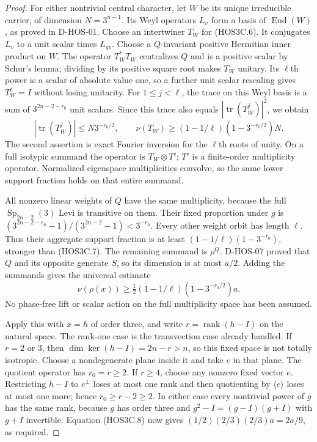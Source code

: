 \begin{proof}
For either nontrivial central character, let $W$ be its unique
irreducible carrier, of dimension $N=3^{n-1}$. Its Weyl operators
$L_v$ form a basis of $\operatorname{End}(W)$, as proved in D-HOS-01.
Choose an intertwiner $T_W$ for (HOS3C.6). It conjugates $L_v$ to
a unit scalar times $L_{gv}$. Choose a $Q$-invariant positive
Hermitian inner product on $W$. The operator $T_W^*T_W$ centralizes
$Q$ and is a positive scalar by Schur's lemma; dividing by its
positive square root makes $T_W$ unitary. Its $\ell$th power is
a scalar of absolute value one, so a further unit scalar rescaling
gives $T_W^\ell=I$ without losing unitarity.
For $1\le j<\ell$, the trace on this Weyl basis is a sum of
$3^{2n-2-r_0}$ unit scalars. Since this trace also equals
$|\operatorname{tr}(T_W^j)|^2$, we obtain
\[
 |\operatorname{tr}(T_W^j)|\le N3^{-r_0/2},\qquad
 \nu(T_W)\ge(1-1/\ell)(1-3^{-r_0/2})N.
 \tag{HOS3C.7}
\]
The second assertion is exact Fourier inversion for the $\ell$th
roots of unity. On a full isotypic summand the operator is
$T_W\otimes T'$; $T'$ is a finite-order multiplicity operator.
Normalized eigenspace multiplicities convolve, so the same lower
support fraction holds on that entire summand.

All nonzero linear weights of $Q$ have the same multiplicity,
because the full $\operatorname{Sp}_{2n-2}(3)$ Levi is transitive
on them. Their fixed proportion under $g$ is
$(3^{2n-2-r_0}-1)/(3^{2n-2}-1)<3^{-r_0}$. Every other weight
orbit has length $\ell$. Thus their aggregate support fraction is
at least $(1-1/\ell)(1-3^{-r_0})$, stronger than (HOS3C.7).
The remaining summand is $\rho^Q$. D-HOS-07 proved that $Q$ and
its opposite generate $S$, so its dimension is at most $a/2$.
Adding the summands gives the universal estimate
\[
 \nu(\rho(x))\ge\tfrac12(1-1/\ell)(1-3^{-r_0/2})a.
 \tag{HOS3C.8}
\]
No phase-free lift or scalar action on the full multiplicity space
has been assumed.

Apply this with $x=h$ of order three, and write
$r=\operatorname{rank}(h-I)$ on the natural space. The rank-one
case is the transvection case already handled. If $r=2$ or $3$,
then $\dim\ker(h-I)=2n-r>n$, so this fixed space is not totally
isotropic. Choose a nondegenerate plane inside it and take $e$
in that plane. The quotient operator has $r_0=r\ge2$.
If $r\ge4$, choose any nonzero fixed vector $e$. Restricting
$h-I$ to $e^\perp$ loses at most one rank and then quotienting
by $\langle e\rangle$ loses at most one more; hence
$r_0\ge r-2\ge2$. In either case every nontrivial power of
$g$ has the same rank, because $g$ has order three and
$g^2-I=(g-I)(g+I)$ with $g+I$ invertible. Equation (HOS3C.8)
now gives $(1/2)(2/3)(2/3)a=2a/9$, as required.
\end{proof}

